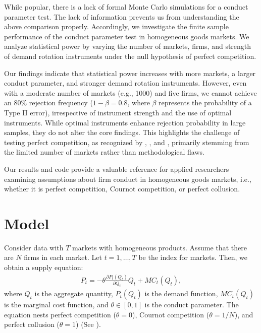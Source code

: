 \documentclass[11pt, a4paper]{article}
\begin{document}
While popular, there is a lack of formal Monte Carlo simulations for a conduct parameter test. 
The lack of information prevents us from understanding the above comparison properly.
Accordingly, we investigate the finite sample performance of the conduct parameter test in homogeneous goods markets. 
We analyze statistical power by varying the number of markets, firms, and strength of demand rotation instruments under the null hypothesis of perfect competition.

Our findings indicate that statistical power increases with more markets, a larger conduct parameter, and stronger demand rotation instruments. 
However, even with a moderate number of markets (e.g., 1000) and five firms, we cannot achieve an 80\% rejection frequency ($1-\beta=0.8$, where $\beta$ represents the probability of a Type II error), irrespective of instrument strength and the use of optimal instruments. While optimal instruments enhance rejection probability in large samples, they do not alter the core findings. 
This highlights the challenge of testing perfect competition, as recognized by \cite{genesove1998testing}, \cite{steen1999testing}, and \cite{shaffer1993test}, primarily stemming from the limited number of markets rather than methodological flaws.

Our results and code provide a valuable reference for applied researchers examining assumptions about firm conduct in homogeneous goods markets, i.e., whether it is perfect competition, Cournot competition, or perfect collusion.

\section{Model}
Consider data with $T$ markets with homogeneous products.
Assume that there are $N$ firms in each market.
Let $t = 1,\ldots, T$ be the index for markets.
Then, we obtain a supply equation:
\begin{align}
     P_{t} = -\theta\frac{\partial P_{t}(Q_{t})}{\partial Q_{t}}Q_{t} + MC_{t}(Q_{t}),\label{eq:supply_equation}
\end{align}
where $Q_{t}$ is the aggregate quantity, $P_{t}(Q_{t})$ is the demand function, $MC_{t}(Q_{t})$ is the marginal cost function, and $\theta\in[0,1]$ is  the conduct parameter. 
The equation nests perfect competition ($\theta=0$), Cournot competition ($\theta=1/N$), and perfect collusion ($\theta=1$) (See \cite{bresnahan1982oligopoly}). 
\end{document}
